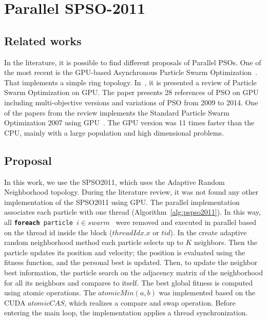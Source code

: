 \documentclass{article}
\begin{document}
    \section{Parallel SPSO-2011}

    \subsection{Related works}

    In the literature, it is possible to find different proposals of Parallel PSOs.
    One of the most recent is the GPU-based Asynchronous Particle Swarm Optimization~\cite{GPUPSO}.
      That implements a simple ring topology.
      In~\cite{ReviewGPUPSO}, it is presented a review of Particle Swarm Optimization on GPU.
      The paper presents 28 references of PSO on GPU including multi-objective versions and variations of PSO from 2009 to 2014.
      One of the papers from the review implements the Standard Particle Swarm Optimization 2007 using GPU~\cite{GPUSPSO2007}. The GPU version was 11 times faster than the CPU, mainly with a large population and high dimensional problems.

      \subsection{Proposal}

    In this work, we use the SPSO2011, which uses the Adaptive Random Neighborhood topology.  
    During the literature review, it was not found any other implementation of the SPSO2011 using GPU.
    The parallel implementation associates each particle with one thread (Algorithm~\ref{alg:pspso2011}).
    In this way, all \texttt{{\bf foreach} particle $ i \in swarm$ } were removed and executed in parallel based on the thread id inside the block ($threadIdx.x$ or $tid$).
    In the create adaptive random neighborhood method each particle selects up to $K$ neighbors. Then the particle updates its position and velocity; the position is evaluated using the fitness function, and the personal best is updated.
    Then, to update the neighbor best information, the particle search on the adjacency matrix of the neighborhood for all its neighbors and compares to itself.
    The best global fitness is computed using atomic operations. The $atomicMin(a, b)$ was implemented based on the CUDA $atomicCAS$, which realizes a compare and swap operation.
    Before entering the main loop, the implementation applies a thread synchronization.
\end{document}
